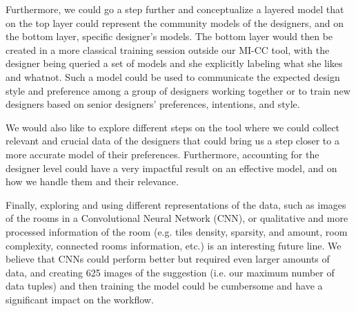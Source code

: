 Furthermore, we could go a step further and conceptualize a layered model that on the top layer could represent the community models of the designers, and on the bottom layer, specific designer's models. The bottom layer would then be created in a more classical training session outside our MI-CC tool, with the designer being queried a set of models and she explicitly labeling what she likes and whatnot.
Such a model could be used to communicate the expected design style and preference among a group of designers working together or to train new designers based on senior designers' preferences, intentions, and style. 

We would also like to explore different steps on the tool where we could collect relevant and crucial data of the designers that could bring us a step closer to a more accurate model of their preferences. Furthermore, accounting for the designer level could have a very impactful result on an effective model, and on how we handle them and their relevance.

Finally, exploring and using different representations of the data, such as images of the rooms in a Convolutional Neural Network (CNN), or qualitative and more processed information of the room (e.g. tiles density, sparsity, and amount, room complexity, connected rooms information, etc.) is an interesting future line. We believe that CNNs could perform better but required even larger amounts of data, and creating 625 images of the suggestion (i.e. our maximum number of data tuples) and then training the model could be cumbersome and have a significant impact on the workflow.

